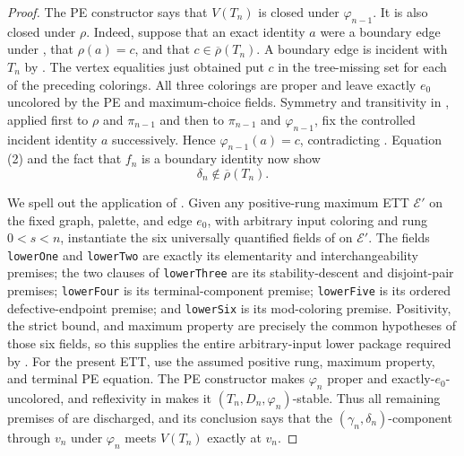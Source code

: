 \begin{proof}
The PE constructor says that $V(T_n)$ is closed under
$\varphi_{n-1}$.  It is also closed under $\rho$.  Indeed, suppose that
an exact identity $a$ were a boundary edge under
, that $\rho(a)=c$, and that
$c\in\overline\rho(T_n)$.  A boundary edge is incident with $T_n$ by
.  The vertex equalities just obtained put $c$
in the tree-missing set for each of the preceding colorings.  All three
colorings are proper and leave exactly $e_0$ uncolored by the PE and
maximum-choice fields.  Symmetry and transitivity in ,
applied first to $\rho$ and $\pi_{n-1}$ and then to
$\pi_{n-1}$ and $\varphi_{n-1}$, fix the controlled incident identity
$a$ successively.  Hence $\varphi_{n-1}(a)=c$, contradicting
.  Equation (2) and the fact that $f_n$
is a boundary identity now show
\[
 \delta_n\notin\overline\rho(T_n).                              \tag{3}
\]

We spell out the application of .  Given any
positive-rung maximum ETT $\mathcal E'$ on the fixed graph, palette, and
edge $e_0$, with arbitrary input coloring and rung $0<s<n$, instantiate
the six universally quantified fields of
 on $\mathcal E'$.  The fields
\texttt{lowerOne} and \texttt{lowerTwo} are exactly its elementarity and
interchangeability premises; the two clauses of \texttt{lowerThree} are
its stability-descent and disjoint-pair premises; \texttt{lowerFour} is
its terminal-component premise; \texttt{lowerFive} is its ordered
defective-endpoint premise; and \texttt{lowerSix} is its mod-coloring
premise.  Positivity, the strict bound, and maximum property are precisely
the common hypotheses of those six fields, so this supplies the entire
arbitrary-input lower package required by .
For the present ETT, use the assumed positive rung, maximum property, and
terminal PE equation.  The PE constructor makes $\varphi_n$ proper and
exactly-$e_0$-uncolored, and reflexivity in  makes it
$(T_n,D_n,\varphi_n)$-stable.  Thus all remaining premises of
 are discharged, and its conclusion says that the
$(\gamma_n,\delta_n)$-component through $v_n$ under $\varphi_n$ meets
$V(T_n)$ exactly at $v_n$.


\end{proof}
